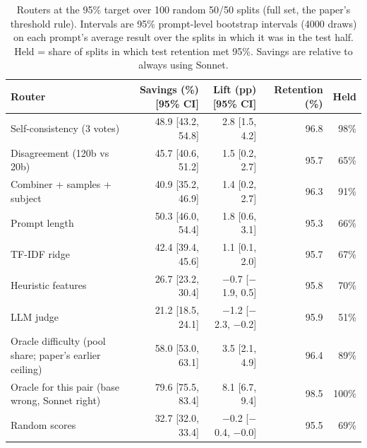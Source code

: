 \begin{table}[!htbp]
\centering\small
\caption{Routers at the 95\% target over 100 random 50/50 splits (full set, the paper's threshold rule). Intervals are 95\% prompt-level bootstrap intervals (4000 draws) on each prompt's average result over the splits in which it was in the test half. Held = share of splits in which test retention met 95\%. Savings are relative to always using Sonnet.}\label{tab:ci}
\begin{tabular}{lrrrr}
\toprule
Router & Savings (\%) [95\% CI] & Lift (pp) [95\% CI] & Retention (\%) & Held \\
\midrule
Self-consistency (3 votes) & 48.9 [43.2, 54.8] & 2.8 [1.5, 4.2] & 96.8 & 98\% \\
Disagreement (120b vs 20b) & 45.7 [40.6, 51.2] & 1.5 [0.2, 2.7] & 95.7 & 65\% \\
Combiner + samples + subject & 40.9 [35.2, 46.9] & 1.4 [0.2, 2.7] & 96.3 & 91\% \\
Prompt length & 50.3 [46.0, 54.4] & 1.8 [0.6, 3.1] & 95.3 & 66\% \\
TF-IDF ridge & 42.4 [39.4, 45.6] & 1.1 [0.1, 2.0] & 95.7 & 67\% \\
Heuristic features & 26.7 [23.2, 30.4] & $-$0.7 [$-$1.9, 0.5] & 95.8 & 70\% \\
LLM judge & 21.2 [18.5, 24.1] & $-$1.2 [$-$2.3, $-$0.2] & 95.9 & 51\% \\
\midrule
Oracle difficulty (pool share; paper's earlier ceiling) & 58.0 [53.0, 63.1] & 3.5 [2.1, 4.9] & 96.4 & 89\% \\
Oracle for this pair (base wrong, Sonnet right) & 79.6 [75.5, 83.4] & 8.1 [6.7, 9.4] & 98.5 & 100\% \\
Random scores & 32.7 [32.0, 33.4] & $-$0.2 [$-$0.4, $-$0.0] & 95.5 & 69\% \\
\bottomrule
\end{tabular}
\end{table}
